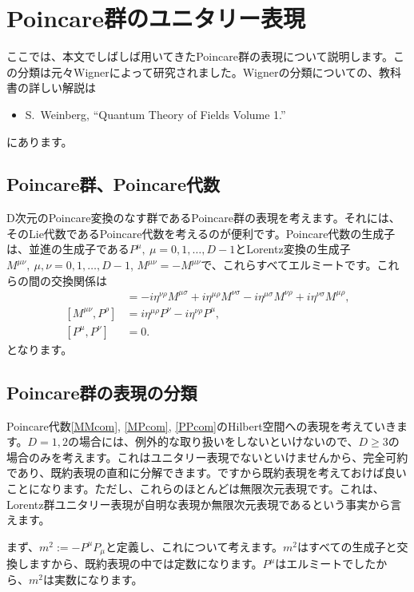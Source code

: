 \documentclass[report,paper=a4, fontsize=12pt, line_length=16cm, number_of_lines=34,dvipdfmx]{jlreq}
\numberwithin{equation}{chapter}
\numberwithin{equation}{section}
\begin{document}
\appendix

\chapter{Poincare群のユニタリー表現}
\label{app:PoincareRep}

ここでは、本文でしばしば用いてきたPoincare群の表現について説明します。この分類は元々Wignerによって研究されました。Wignerの分類についての、教科書の詳しい解説は
\begin{itemize}
  \item S.~Weinberg, ``Quantum Theory of Fields Volume 1.''
\end{itemize}
にあります。

\section{Poincare群、Poincare代数}
D次元のPoincare変換のなす群であるPoincare群の表現を考えます。それには、そのLie代数であるPoincare代数を考えるのが便利です。Poincare代数の生成子は、並進の生成子である$P^{\mu},\ \mu=0,1,\dots, D-1$とLorentz変換の生成子$M^{\mu\nu},\ \mu,\nu=0,1,\dots,D-1$, $M^{\mu\nu}=-M^{\mu\nu}$で、これらすべてエルミートです。これらの間の交換関係は
\begin{align}
  [M^{\mu\nu},M^{\rho\sigma}]&=-i\eta^{\nu\rho}M^{\mu\sigma}+i\eta^{\mu\rho}M^{\nu\sigma}-i\eta^{\mu\sigma}M^{\nu\rho}+i\eta^{\nu\sigma}M^{\mu\rho},\label{MMcom}\\
  [M^{\mu\nu},P^{\rho}]&=i\eta^{\mu\rho}P^{\nu}-i\eta^{\nu\rho}P^{\mu},\label{MPcom}\\
  [P^{\mu},P^{\nu}]&=0.\label{PPcom}
\end{align}
となります。

\section{Poincare群の表現の分類}
Poincare代数\eqref{MMcom}, \eqref{MPcom}, \eqref{PPcom}のHilbert空間への表現を考えていきます。$D=1,2$の場合には、例外的な取り扱いをしないといけないので、$D\ge 3$の場合のみを考えます。これはユニタリー表現でないといけませんから、完全可約であり、既約表現の直和に分解できます。ですから既約表現を考えておけば良いことになります。ただし、これらのほとんどは無限次元表現です。これは、Lorentz群ユニタリー表現が自明な表現か無限次元表現であるという事実から言えます。

まず、$m^2:=-P^{\mu}P_{\mu}$と定義し、これについて考えます。$m^2$はすべての生成子と交換しますから、既約表現の中では定数になります。$P^{\mu}$はエルミートでしたから、$m^2$は実数になります。
\end{document}
